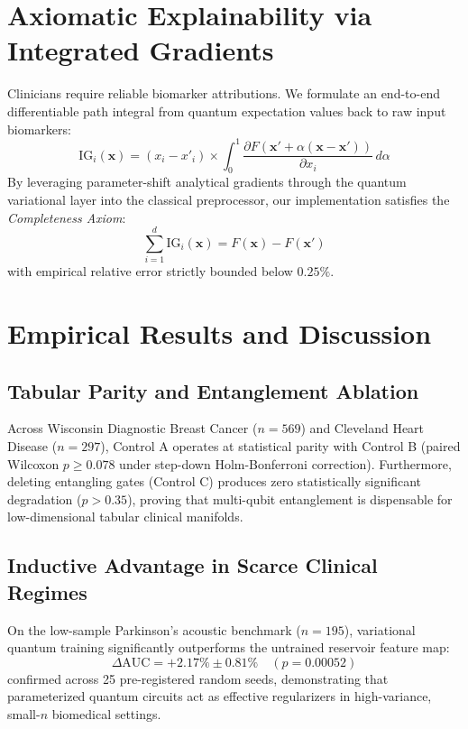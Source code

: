\documentclass[conference]{IEEEtran}
\begin{document}
\section{Axiomatic Explainability via Integrated Gradients}
Clinicians require reliable biomarker attributions. We formulate an end-to-end differentiable path integral from quantum expectation values back to raw input biomarkers:
\begin{equation}
\text{IG}_i(\mathbf{x}) = (x_i - x'_i) \times \int_{0}^{1} \frac{\partial F(\mathbf{x}' + \alpha (\mathbf{x} - \mathbf{x}'))}{\partial x_i} \, d\alpha
\end{equation}
By leveraging parameter-shift analytical gradients through the quantum variational layer into the classical preprocessor, our implementation satisfies the \textit{Completeness Axiom}:
\begin{equation}
\sum_{i=1}^{d} \text{IG}_i(\mathbf{x}) = F(\mathbf{x}) - F(\mathbf{x}')
\end{equation}
with empirical relative error strictly bounded below $0.25\%$.

\section{Empirical Results and Discussion}

\subsection{Tabular Parity and Entanglement Ablation}
Across Wisconsin Diagnostic Breast Cancer ($n=569$) and Cleveland Heart Disease ($n=297$), Control A operates at statistical parity with Control B (paired Wilcoxon $p \ge 0.078$ under step-down Holm-Bonferroni correction). Furthermore, deleting entangling gates (Control C) produces zero statistically significant degradation ($p > 0.35$), proving that multi-qubit entanglement is dispensable for low-dimensional tabular clinical manifolds.

\subsection{Inductive Advantage in Scarce Clinical Regimes}
On the low-sample Parkinson's acoustic benchmark ($n=195$), variational quantum training significantly outperforms the untrained reservoir feature map:
\begin{equation}
\Delta \text{AUC} = +2.17\% \pm 0.81\% \quad (p = 0.00052)
\end{equation}
confirmed across 25 pre-registered random seeds, demonstrating that parameterized quantum circuits act as effective regularizers in high-variance, small-$n$ biomedical settings.
\end{document}
